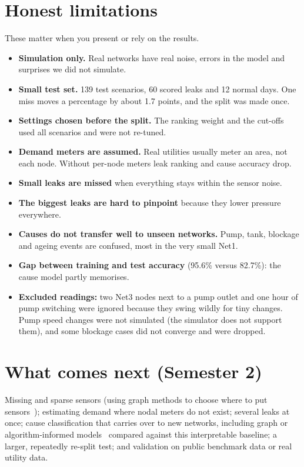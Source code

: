 \documentclass[11pt,a4paper]{article}
\begin{document}
\section{Honest limitations}
\begin{note}
These matter when you present or rely on the results.
\end{note}
\begin{itemize}[itemsep=3pt]
\item \textbf{Simulation only.} Real networks have real noise, errors in the model and surprises we did not simulate.
\item \textbf{Small test set.} 139 test scenarios, 60 scored leaks and 12 normal days. One miss moves a percentage by about 1.7 points, and the split was made once.
\item \textbf{Settings chosen before the split.} The ranking weight and the cut-offs used all scenarios and were not re-tuned.
\item \textbf{Demand meters are assumed.} Real utilities usually meter an area, not each node. Without per-node meters leak ranking and cause accuracy drop.
\item \textbf{Small leaks are missed} when everything stays within the sensor noise.
\item \textbf{The biggest leaks are hard to pinpoint} because they lower pressure everywhere.
\item \textbf{Causes do not transfer well to unseen networks.} Pump, tank, blockage and ageing events are confused, most in the very small Net1.
\item \textbf{Gap between training and test accuracy} (95.6\% versus 82.7\%): the cause model partly memorises.
\item \textbf{Excluded readings:} two Net3 nodes next to a pump outlet and one hour of pump switching were ignored because they swing wildly for tiny changes. Pump speed changes were not simulated (the simulator does not support them), and some blockage cases did not converge and were dropped.
\end{itemize}

\section{What comes next (Semester 2)}
Missing and sparse sensors (using graph methods to choose where to put sensors~\cite{leonzio2026centrality}); estimating demand where nodal meters do not exist; several leaks at once; cause classification that carries over to new networks, including graph or algorithm-informed models~\cite{zhang2026aignn} compared against this interpretable baseline; a larger, repeatedly re-split test; and validation on public benchmark data or real utility data.
\end{document}
